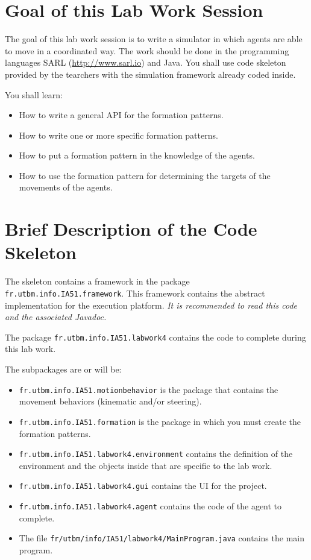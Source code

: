 \documentclass[article,english,nodocumentinfo]{multiagentfrreport}
\begin{document}
\section{Goal of this Lab Work Session}

The goal of this lab work session is to write a simulator in which agents are able to move in a coordinated way.
The work should be done in the programming languages SARL (\url{http://www.sarl.io}) and Java.
You shall use code skeleton provided by the tearchers with the simulation framework already coded inside.

You shall learn: 
\begin{itemize}
\item How to write a general API for the formation patterns.
\item How to write one or more specific formation patterns.
\item How to put a formation pattern in the knowledge of the agents.
\item How to use the formation pattern for determining the targets of the movements of the agents. 
\end{itemize}



\section{Brief Description of the Code Skeleton}

The skeleton contains a framework in the package \texttt{fr.utbm.info.IA51.framework}.
This framework contains the abstract implementation for the execution platform.
\emph{It is recommended to read this code and the associated Javadoc.}

The package \texttt{fr.utbm.info.IA51.labwork4} contains the code to complete during this lab work.

The subpackages are or will be:
\begin{itemize}
\item \texttt{fr.utbm.info.IA51.motionbehavior} is the package that contains the movement behaviors (kinematic and/or steering).
\item \texttt{fr.utbm.info.IA51.formation} is the package in which you must create the formation patterns.
\item \texttt{fr.utbm.info.IA51.labwork4.environment} contains the definition of the environment and the objects inside that are specific to the lab work.
\item \texttt{fr.utbm.info.IA51.labwork4.gui} contains the UI for the project.
\item \texttt{fr.utbm.info.IA51.labwork4.agent} contains the code of the agent to complete.
\item The file \texttt{fr/utbm/info/IA51/labwork4/MainProgram.java} contains the main program.
\end{itemize}
\end{document}
